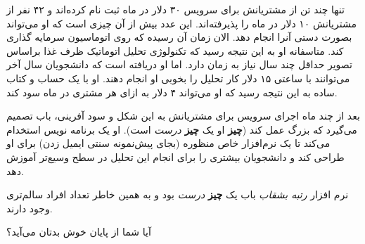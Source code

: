 تنها چند تن از مشتریانش برای سرویس ۳۰ دلار در ماه ثبت نام کرده‌اند و ۴۲
نفر از مشتریانش ۱۰ دلار در ماه را پذیرفته‌اند. این عدد بیش از آن چیزی
است که او می‌تواند بصورت دستی آنرا انجام دهد. الان زمان آن رسیده که روی
اتوماسیون سرمایه گذاری کند. متاسفانه او به این نتیجه رسید که تکنولوژی
تحلیل اتوماتیک ظرف غذا براساس تصویر حداقل چند سال نیاز به زمان دارد. اما
او دریافته است که دانشجویان سال آخر می‌توانند با ساعتی ۱۵ دلار کار تحلیل
را بخوبی او انجام دهند. او با یک حساب و کتاب ساده به این نتیجه رسید که
او می‌تواند ۴ دلار به ازای هر مشتری در ماه سود کند.

بعد از چند ماه اجرای سرویس برای مشتریانش به این شکل و سود آفرینی، باب
تصمیم می‌گیرد که بزرگ عمل کند (\textbf{چیز} او یک \textbf{چیز}
\emph{درست} است). او یک برنامه نویس استخدام می‌کند تا یک نرم‌افزار خاص
منظوره (بجای پیش‌نمونه سنتی ایمیل زدن) برای او طراحی کند و دانشجویان
بیشتری را برای انجام این تحلیل در سطح وسیع‌تر آموزش دهد.

نرم افزار \emph{رتبه بشقاب} باب یک \textbf{چیز} \emph{درست} بود و به
همین خاطر تعداد افراد سالم‌تری وجود دارند.

آیا شما از پایان خوش بدتان می‌آید؟
